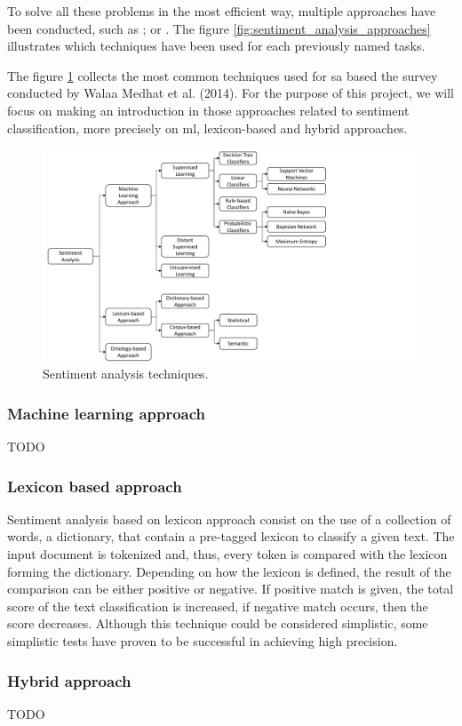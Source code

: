 To solve all these problems in the most efficient way, multiple approaches have been conducted, such as \cite{tripathy2016classification}; \cite{mullen2004sentiment} or \cite{pouransari2014deep}. The figure \ref{fig:sentiment_analysis_approaches} illustrates which techniques have been used for each previously named tasks.

\FloatBarrier

The figure \ref{fig:sentiment_analysis_techniques} collects the most common techniques used for \acrshort{sa} based the survey conducted by Walaa Medhat et al. (2014). For the purpose of this project, we will focus on making an introduction in those approaches related to sentiment classification, more precisely on \acrfull{ml}, lexicon-based and hybrid approaches.

\begin{figure}[!htp]
  \center
  \includegraphics[width=1\textwidth]{figures/sentiment_analysis_techniques}
  \caption{Sentiment analysis techniques\cite{medhat2014sentiment}.}
  \label{fig:sentiment_analysis_techniques}
\end{figure}

\FloatBarrier

\subsubsection{Machine learning approach}
\label{subsubsec:techniques_machine_learning}

TODO

\subsubsection{Lexicon based approach}
\label{subsubsec:techniques_lexicon_based}

Sentiment analysis based on lexicon approach consist on the use of a collection of words, a dictionary, that contain a pre-tagged lexicon to classify a given text. The input document is tokenized and, thus, every token is compared with the lexicon forming the dictionary. Depending on how the lexicon is defined, the result of the comparison can be either positive or negative. If positive match is given, the total score of the text classification is increased, if negative match occurs, then the score decreases. Although this technique could be considered simplistic, some simplistic tests \cite{hatzivassiloglou2000effects} have proven to be successful in achieving high precision. 

\subsubsection{Hybrid approach}
\label{subsubsec:techniques_hybrid}

TODO \cite{thakkar2015approaches}